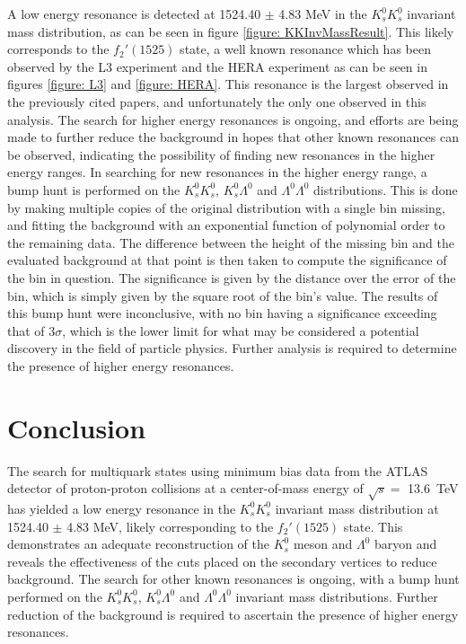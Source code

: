 \documentclass{article}
\begin{document}
A low energy resonance is detected at 1524.40 $\pm$ 4.83 MeV in the $K^0_sK^0_s$
invariant mass distribution, as can be seen in figure \ref{figure: KKInvMassResult}.
This likely corresponds to the $f_2'(1525)$ state,
a well known resonance which has been observed by the L3 experiment \cite{L3}
and the HERA experiment \cite{HERA} as can be seen in figures \ref{figure: L3}
and \ref{figure: HERA}. This resonance is the largest observed in the previously 
cited papers, and unfortunately the only one observed in this analysis. The search 
for higher energy resonances is ongoing, and efforts are being made to further 
reduce the background in hopes that other known resonances can 
be observed, indicating the possibility of finding new resonances in the higher 
energy ranges. In searching for new resonances in the higher energy range, a 
bump hunt is performed on the $K^0_sK^0_s$, $K^0_s\Lambda^0$ and $\Lambda^0\Lambda^0$ 
distributions. This is done by making multiple copies of the original distribution 
with a single bin missing, and fitting the background with an exponential function of 
polynomial order to the remaining data. The difference between the height of the missing 
bin and the evaluated background at that point is then taken to compute the significance 
of the bin in question. The significance is given by the distance over the error of the bin,
which is simply given by the square root of the bin's value. The results of this bump hunt 
were inconclusive, with no bin having a significance exceeding that of $3\sigma$, which is 
the lower limit for what may be considered a potential discovery in the field of particle 
physics. Further analysis is required to determine the presence of higher energy
resonances. 


\section{Conclusion}
The search for multiquark states using minimum bias data from the ATLAS detector 
of proton-proton collisions at a center-of-mass energy of $\sqrt{s} =$ \SI{13.6}{TeV}
has yielded a low energy resonance in the $K^0_sK^0_s$ invariant mass distribution at 
1524.40 $\pm$ 4.83 MeV, likely corresponding to the $f_2'(1525)$ state. 
This demonstrates an adequate reconstruction of the $K^0_s$ meson and $\Lambda^0$ baryon
and reveals the effectiveness of the cuts placed on the secondary
vertices to reduce background. The search for other known resonances is ongoing,
with a bump hunt performed on the $K^0_sK^0_s$, $K^0_s\Lambda^0$ and $\Lambda^0\Lambda^0$
invariant mass distributions. Further reduction of the background is required to 
ascertain the presence of higher energy resonances.
\end{document}
